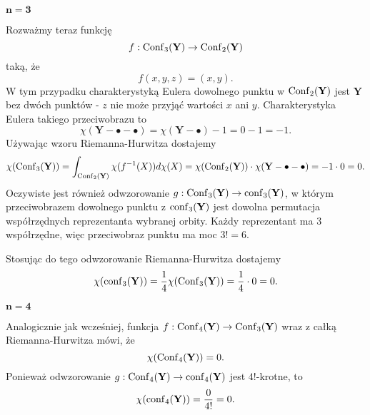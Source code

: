 \bigskip

$\mathbf{n=3}$ \dotfill

Rozważmy teraz funkcję 
$$f:\operatorname{Conf}_3(\mathbf{Y})\to \operatorname{Conf}_2(\mathbf{Y})$$ 
taką, że 
$$f(x, y, z)=(x, y).$$
W tym przypadku charakterystyką Eulera dowolnego punktu w $\operatorname{Conf}_2(\mathbf{Y})$ jest $\mathbf{Y}$ bez dwóch punktów - $z$ nie może przyjąć wartości $x$ ani $y$. Charakterystyka Eulera takiego przeciwobrazu to 
$$\chi(\mathbf{Y}-\bullet-\bullet)=\chi(\mathbf{Y}-\bullet)-1=0-1=-1.$$
Używając wzoru Riemanna-Hurwitza dostajemy
$$\chi(\operatorname{Conf}_3(\mathbf{Y}))=\int_{\operatorname{Conf}_2(\mathbf{Y})}\chi(f^{-1}(X))d\chi(X)=\chi(\operatorname{Conf}_2(\mathbf{Y}))\cdot\chi(\mathbf{Y}-\bullet-\bullet)=-1\cdot0=0.$$
Oczywiste jest również odwzorowanie $g:\operatorname{Conf}_3(\mathbf{Y})\to \operatorname{conf}_3(\mathbf{Y})$, w którym przeciwobrazem dowolnego punktu z $\operatorname{conf}_3(\mathbf{Y})$ jest dowolna permutacja współrzędnych reprezentanta wybranej orbity. Każdy reprezentant ma $3$ współrzędne, więc przeciwobraz punktu ma moc $3!=6$.

Stosując do tego odwzorowanie Riemanna-Hurwitza dostajemy
$$\chi(\operatorname{conf}_3(\mathbf{Y}))=\frac{1}{4}\chi(\operatorname{Conf}_3(\mathbf{Y}))=\frac{1}{4}\cdot 0=0.$$
\bigskip

$\mathbf{n=4}$ \dotfill

Analogicznie jak wcześniej, funkcja $f:\operatorname{Conf}_4(\mathbf{Y})\to \operatorname{Conf}_3(\mathbf{Y})$ wraz z całką Riemanna-Hurwitza mówi, że
$$\chi(\operatorname{Conf}_4(\mathbf{Y}))=0.$$
Ponieważ odwzorowanie $g:\operatorname{Conf}_4(\mathbf{Y})\to \operatorname{conf}_4(\mathbf{Y})$ jest $4!$-krotne, to 
$$\chi(\operatorname{conf}_4(\mathbf{Y}))=\frac{0}{4!}=0.$$

